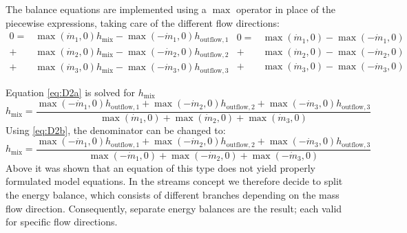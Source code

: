 The balance equations are implemented using a $\operatorname{max}$ operator in place of
the piecewise expressions, taking care of the different flow directions:
\begin{subequations}
\begin{equation}
\begin{split}
0=&\operatorname{max}(\dot{m}_1,0)h_{\mathrm{mix}}-\operatorname{max}(-\dot{m}_1,0)h_{\mathrm{outflow},1}\\
+&\operatorname{max}(\dot{m}_2,0)h_{\mathrm{mix}}-\operatorname{max}(-\dot{m}_2,0)h_{\mathrm{outflow},2}\\
+&\operatorname{max}(\dot{m}_3,0)h_{\mathrm{mix}}-\operatorname{max}(-\dot{m}_3,0)h_{\mathrm{outflow},3}
\end{split}
\label{eq:D2a}
\end{equation}

\begin{equation}
\begin{split}
0=&\operatorname{max}(\dot{m}_1,0)-\operatorname{max}(-\dot{m}_1,0)\\
+&\operatorname{max}(\dot{m}_2,0)-\operatorname{max}(-\dot{m}_2,0)\\
+&\operatorname{max}(\dot{m}_3,0)-\operatorname{max}(-\dot{m}_3,0)
\end{split}
\label{eq:D2b}
\end{equation}
\label{eq:D2}
\end{subequations}

Equation \eqref{eq:D2a} is solved for $h_{\mathrm{mix}}$
\begin{equation*}
h_{\mathrm{mix}}=\frac{\operatorname{max}(-\dot{m}_1,0)h_{\mathrm{outflow},1}+\operatorname{max}(-\dot{m}_2,0)h_{\mathrm{outflow},2}+\operatorname{max}(-\dot{m}_3,0)h_{\mathrm{outflow},3}}
{\operatorname{max}(\dot{m}_1,0)+\operatorname{max}(\dot{m}_2,0)+\operatorname{max}(\dot{m}_3,0)}
\end{equation*}
Using \eqref{eq:D2b}, the denominator can be changed to:
\begin{equation*}
h_{\mathrm{mix}}=\frac{\operatorname{max}(-\dot{m}_1,0)h_{\mathrm{outflow},1}+\operatorname{max}(-\dot{m}_2,0)h_{\mathrm{outflow},2}+\operatorname{max}(-\dot{m}_3,0)h_{\mathrm{outflow},3}}
{\operatorname{max}(-\dot{m}_1,0)+\operatorname{max}(-\dot{m}_2,0)+\operatorname{max}(-\dot{m}_3,0)}
\end{equation*}
Above it was shown that an equation of this type does not yield properly
formulated model equations. In the streams concept we therefore decide
to split the energy balance, which consists of different branches
depending on the mass flow direction. Consequently, separate energy
balances are the result; each valid for specific flow directions.


